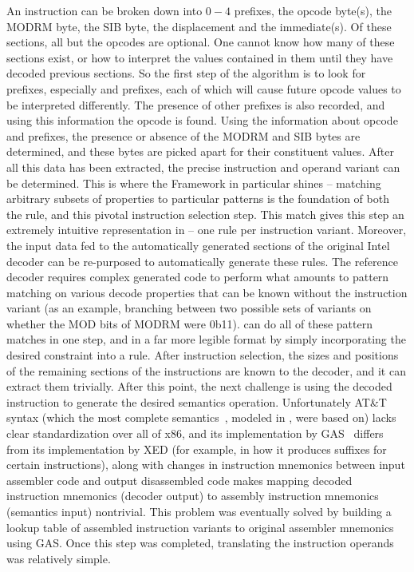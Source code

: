 An \GENISA instruction can be broken down into $0-4$ prefixes, the opcode byte(s), the MODRM byte, the SIB byte, the displacement and the immediate(s).  Of these sections, all but the opcodes are optional.  One cannot know how many of these sections exist, or how to interpret the values contained in them until they have decoded previous sections.  So the first step of the algorithm is to look for prefixes, especially  and  prefixes, each of which will cause future opcode values to be interpreted differently.  The presence of other prefixes is also recorded, and using this information the opcode is found.  Using the information about opcode and prefixes, the presence or absence of the MODRM and SIB bytes are determined, and these bytes are picked apart for their constituent values.  After all this data has been extracted, the precise instruction and operand variant can be determined.  This is where the \K Framework in particular shines – matching arbitrary subsets of properties to particular patterns is the foundation of both the \K rule, and this pivotal instruction selection step.  This match gives this step an extremely intuitive representation in \K – one rule per instruction variant.  Moreover, the input data fed to the automatically generated sections of the original Intel decoder can be re-purposed to automatically generate these \K rules.  The reference decoder requires complex generated code to perform what amounts to pattern matching on various decode properties that can be known without the instruction variant (as an example, branching between two possible sets of variants on whether the MOD bits of MODRM were 0b11).  \K can do all of these pattern matches in one step, and in a far more legible format by simply incorporating the desired constraint into a rule. After instruction selection, the sizes and positions of the remaining sections of the instructions are known to the decoder, and it can extract them trivially.  After this point, the next challenge is using the decoded instruction to generate the desired semantics operation.  Unfortunately AT\&T syntax (which the most complete \ISA semantics~\cite{Dasgupta:2019}, modeled in \K, were based on) lacks clear standardization over all of x86, and its implementation by GAS~\cite{gas} differs from its implementation by XED (for example, in how it produces suffixes for certain instructions), along with changes in instruction mnemonics between input assembler code and output disassembled code makes mapping decoded instruction mnemonics (decoder output) to assembly instruction mnemonics (semantics input) nontrivial.  This problem was eventually solved by building a lookup table of assembled instruction variants to original assembler mnemonics using GAS.  Once this step was completed, translating the instruction operands was relatively simple.

